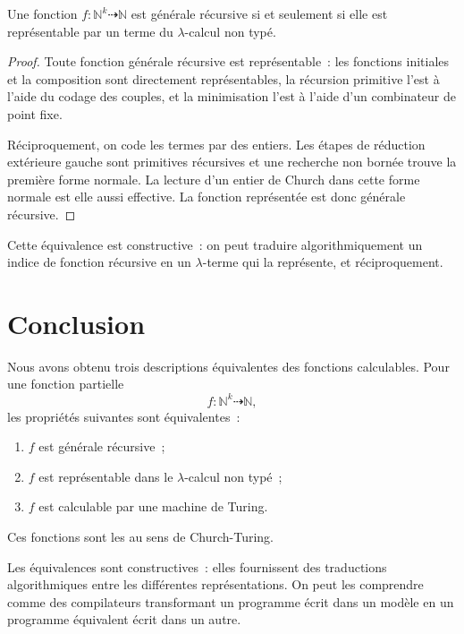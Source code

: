 \begin{thm}\label{recursive-functions-lambda-calculus}
Une fonction
$f\colon\mathbb{N}^k\dasharrow\mathbb{N}$ est générale récursive si et
seulement si elle est représentable par un terme du $\lambda$-calcul
non typé.
\end{thm}

\begin{proof}
Toute fonction générale récursive est représentable : les fonctions
initiales et la composition sont directement représentables, la
récursion primitive l'est à l'aide du codage des couples, et la
minimisation l'est à l'aide d'un combinateur de point fixe.

Réciproquement, on code les termes par des entiers.  Les étapes de
réduction extérieure gauche sont primitives récursives et une
recherche non bornée trouve la première forme normale.  La lecture
d'un entier de Church dans cette forme normale est elle aussi
effective.  La fonction représentée est donc générale récursive.
\end{proof}

Cette équivalence est constructive : on peut traduire
algorithmiquement un indice de fonction récursive en un
$\lambda$-terme qui la représente, et réciproquement.

\section{Conclusion}\label{section-computability-conclusion}

\thingy Nous avons obtenu trois descriptions équivalentes des fonctions
calculables.  Pour une fonction partielle
\[
f\colon\mathbb{N}^k\dasharrow\mathbb{N},
\]
les propriétés suivantes sont équivalentes :
\begin{enumerate}
\item $f$ est générale récursive ;
\item $f$ est représentable dans le $\lambda$-calcul non typé ;
\item $f$ est calculable par une machine de Turing.
\end{enumerate}
Ces fonctions sont les  au sens de
Church-Turing.

Les équivalences sont constructives : elles fournissent des traductions
algorithmiques entre les différentes représentations.  On peut les
comprendre comme des compilateurs transformant un programme écrit dans
un modèle en un programme équivalent écrit dans un autre.


